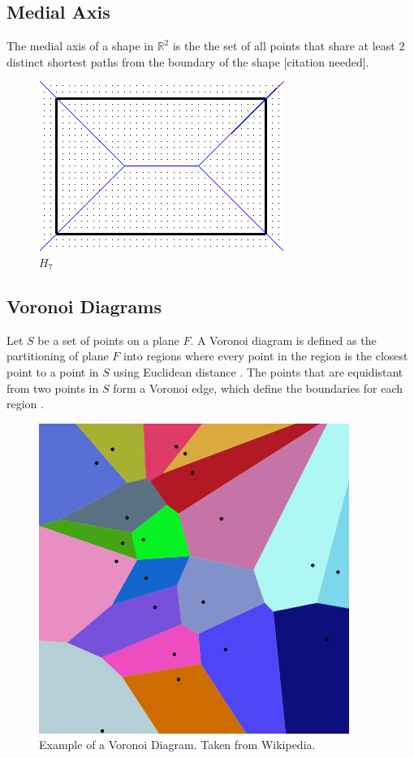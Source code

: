 \documentclass[12 pt]{article}
\begin{document}
\subsection*{Medial Axis}
The medial axis of a shape in $\mathbb{R}^2$ is the the set of all points that share at least 2 distinct shortest paths from the boundary of the shape [citation needed].

\begin{figure}[h]
\caption{$H_7$}
\centering
\includegraphics[scale=0.45]{medax.png}
\end{figure}

\subsection*{Voronoi Diagrams}
	Let $S$ be a set of points on a plane $F$. A Voronoi diagram is defined as the partitioning of plane $F$ into regions where every point in the region is the closest point to a point in $S$ using Euclidean distance \cite{GFALOP:1}. The points that are equidistant from two points in $S$ form a Voronoi edge, which define the boundaries for each region \cite{GFALOP:1}.
\begin{figure}[h]
\caption{Example of a Voronoi Diagram. Taken from Wikipedia.}
\centering
\includegraphics[scale=0.5]{voronoi.png}
\end{figure}
\end{document}
